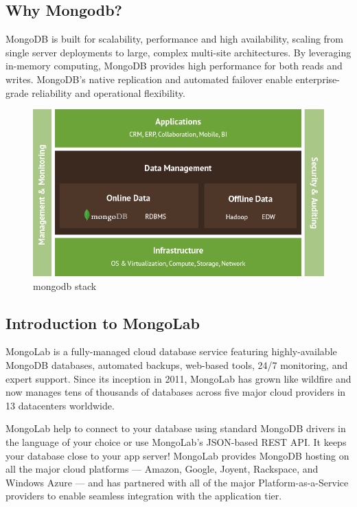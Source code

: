 \documentclass[14pt,a4paper]{extreport}
\begin{document}
		\subsection{Why Mongodb?}
		MongoDB is built for scalability, performance and high availability, scaling from single server deployments to large, complex multi-site architectures. By leveraging in-memory computing, MongoDB provides high performance for both reads and writes. MongoDB’s native replication and automated failover enable enterprise-grade reliability and operational flexibility.
		\begin{figure}
			\begin{center}
				\includegraphics[scale=0.5]{mongodb_stack.png}
				\caption{mongodb stack}
			\end{center}
		\end{figure}
				
		\subsection{Introduction to MongoLab}
		MongoLab is a fully-managed cloud database service featuring highly-available MongoDB databases, automated backups, web-based tools, 24/7 monitoring, and expert support. Since its inception in 2011, MongoLab has grown like wildfire and now manages tens of thousands of databases across five major cloud providers in 13 datacenters worldwide.
		
		MongoLab help to connect to your database using standard MongoDB drivers in the language of your choice or use MongoLab's JSON-based REST API. It keeps your database close to your app server! MongoLab provides MongoDB hosting on all the major cloud platforms — Amazon, Google, Joyent, Rackspace, and Windows Azure — and has partnered with all of the major Platform-as-a-Service providers to enable seamless integration with the application tier.
	
\end{document}
